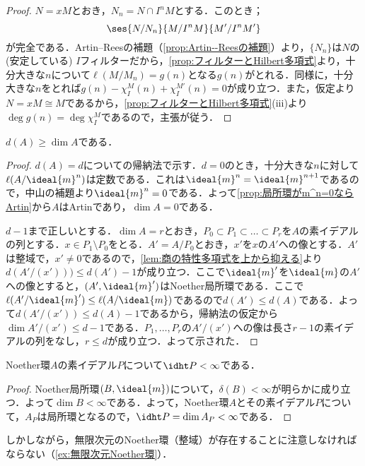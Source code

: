 \begin{proof}
	$N=xM$とおき，$N_n=N\cap I^nM$とする．このとき；
	\[\ses{N/N_n}{M/I^nM}{M'/I^nM'}\]
	が完全である．Artin--Reesの補題（\ref{prop:Artin--Reesの補題}）より，$\{N_n\}$は$N$の(安定している) $I$フィルターだから，\ref{prop:フィルターとHilbert多項式}より，十分大きな$n$について$\ell(M/M_n)=g(n)$となる$g(n)$がとれる．同様に，十分大きな$n$をとれば$g(n)-\chi_I^M(n)+\chi_I^{M'}(n)=0$が成り立つ．また，仮定より$N=xM\cong M$であるから，\ref{prop:フィルターとHilbert多項式}(iii)より$\deg g(n)=\deg\chi_I^M$であるので，主張が従う．
\end{proof}

\begin{prop}\label{prop:d(A)geq dim A}
	$d(A)\geq\dim A$である．
\end{prop}

\begin{proof}
	$d(A)=d$についての帰納法で示す．$d=0$のとき，十分大きな$n$に対して$\ell(A/\ideal{m}^n)$は定数である．これは$\ideal{m}^n=\ideal{m}^{n+1}$であるので，中山の補題より$\ideal{m}^n=0$である．よって\ref{prop:局所環がm^n=0ならArtin}から$A$はArtinであり，$\dim A=0$である．
		
	$d-1$まで正しいとする．$\dim A=r$とおき，$P_0\subset P_1\subset\dots\subset P_r$を$A$の素イデアルの列とする．$x\in P_1\setminus P_0$をとる．$A'=A/P_0$とおき，$x'$を$x$の$A'$への像とする．$A'$は整域で，$x'\neq0$であるので，\ref{lem:商の特性多項式を上から抑える}より$d(A'/(x')))\leq d(A')-1$が成り立つ．ここで$\ideal{m}'$を$\ideal{m}$の$A'$への像とすると，$(A',\ideal{m}')$はNoether局所環である．ここで$\ell(A'/\ideal{m}')\leq \ell(A/\ideal{m})$であるので$d(A')\leq d(A)$である．よって$d(A'/(x'))\leq d(A)-1$であるから，帰納法の仮定から$\dim A'/(x')\leq d-1$である．$P_1,\dots,P_r$の$A'/(x')$への像は長さ$r-1$の素イデアルの列をなし，$r\leq d$が成り立つ．よって示された．
\end{proof}

\begin{cor}
	Noether環$A$の素イデアル$P$について$\idht P<\infty$である．
\end{cor}

\begin{proof}
	Noether局所環$(B,\ideal{m})$について，$\delta(B)<\infty$が明らかに成り立つ．よって$\dim B<\infty$である．よって，Noether環$A$とその素イデアル$P$について，$A_P$は局所環となるので，$\idht P=\dim A_P<\infty$である．
\end{proof}

しかしながら，無限次元のNoether環（整域）が存在することに注意しなければならない（\ref{ex:無限次元Noether環}）．

